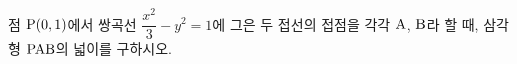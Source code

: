 점 $\mathrm{P}(0{,}\mkern3mu\mathopen{}1)$에서 쌍곡선 $\dfrac{x^2}{3}-y^2=1$에 그은 두 접선의 접점을 각각 $\mathrm{A}$, $\mathrm{B}$라 할 때, 삼각형 $\mathrm{PAB}$의 넓이를 구하시오.
